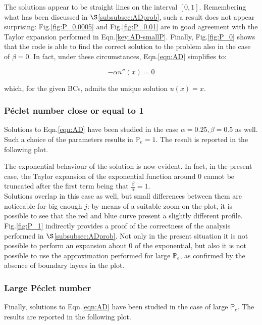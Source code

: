 \documentclass[11pt]{article}
\theoremstyle{theorem}
\theoremstyle{definition}
\begin{document}
The solutions appear to be straight lines on the interval $[0, 1]$. Remembering what has been discussed in $\S$\ref{subsubsec:ADprob}, such a result does not appear surprising: Fig.\ref{fig:P_0.0005} and Fig.\ref{fig:P_0.01} are in good agreement with the Taylor expansion performed in Eqn.\eqref{key:AD-smallP}. Finally, Fig.\ref{fig:P_0} shows that the code is able to find the correct solution to the problem also in the case of $\beta=0$. In fact, under these circumstances, Eqn.\eqref{eqn:AD} simplifies to:

$$-\alpha u''(x)=0$$

which, for the given BCs, admits the unique solution $u(x)=x$.\\

\subsubsection{P\'{e}clet number close or equal to 1}
Solutions to Eqn.\eqref{eqn:AD} have been studied in the case $\alpha=0.25, \beta=0.5$ as well. Such a choice of the parameters results in $\mathbb{P}_e=1$. The result is reported in the following plot.

The exponential behaviour of the solution is now evident. In fact, in the present case, the Taylor expansion of the exponential function around 0 cannot be truncated after the first term being that $\frac{\beta}{\alpha}=1$.\\
Solutions overlap in this case as well, but small differences between them are noticeable for big enough $ j $: by means of a suitable zoom on the plot, it is possible to see that the red and blue curve present a slightly different profile.\\
Fig.\ref{fig:P_1} indirectly provides a proof of the correctness of the analysis performed in $\S$\ref{subsubsec:ADprob}. Not only in the present situation it is not possible to perform an expansion about $0$ of the exponential, but also it is not possible to use the approximation performed for large $\mathbb{P}_e$, as confirmed by the absence of boundary layers in the plot.\\

\subsubsection{Large P\'{e}clet number}
Finally, solutions to Eqn.\eqref{eqn:AD} have been studied in the case of large $\mathbb{P}_e$. The results are reported in the following plot.
\end{document}
